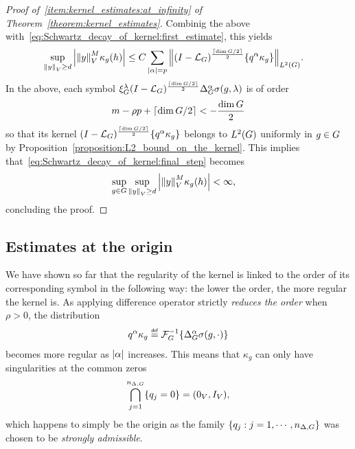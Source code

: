 \begin{proof}[Proof of~\ref{item:kernel_estimates:at_infinity} of Theorem~\ref{theorem:kernel_estimates}]
    Combinig the above with~\eqref{eq:Schwartz_decay_of_kernel:first_estimate},
    this yields
    \begin{align}
        \sup_{\norm y \geq d} &\abs{\norm y^M \kappa_g(h)}
        \leq C \sum_{\abs \alpha = p} \norm [\Lebesgue 2 \Group] {\BesselPotential {\Ceiling {\dim \Group / 2}} \{q^\alpha \kappa_g\}}.
        \label{eq:Schwartz_decay_of_kernel:final_step}
    \end{align}
    In the above,
    each symbol $\xi^{\lambda}_{G} (I - {\mathcal{L}_{G}})^\frac{\lceil\dim G / 2\rceil}{2} {\Delta_{G}^{\alpha}} \sigma(g, \lambda)$ is of order
    \begin{align*}
        m - \rho p + \lceil\dim G / 2\rceil < -\frac {\dim G} 2
    \end{align*}
    so that its kernel $(I - {\mathcal{L}_{G}})^\frac{\lceil\dim G / 2\rceil}{2} \{q^\alpha \kappa_g\}$ belongs to ${L^{2} (G)}$ uniformly in $g \in G$ by Proposition~\ref{proposition:L2_bound_on_the_kernel}.
    This implies that~\eqref{eq:Schwartz_decay_of_kernel:final_step} becomes
    \begin{align*}
        \sup_{g \in G} \sup_{{\left\| y \right\|}_{V} \geq d} &\left|{{\left\| y \right\|}_{V}^M \kappa_g(h)}\right| < \infty,
    \end{align*}
    concluding the proof.
\end{proof}

\subsection{Estimates at the origin}

We have shown so far that the regularity of the kernel is linked to the order of its corresponding symbol in the following way:
the lower the order, the more regular the kernel is.
As applying difference operator strictly \emph{reduces the order} when $\rho > 0$,
the distribution
\begin{align*}
    q^\alpha \kappa_g \defeq \InverseFourier \{ \DifferenceOperatorOrder \alpha \sigma(g, \dummy) \}
\end{align*}
becomes more regular as $\left|{\alpha}\right|$ increases.
This means that $\kappa_g$ can only have singularities at the common zeros
\begin{align*}
    \bigcap_{j = 1}^{n_{\Delta, G}} \{ q_j = 0 \} = (0_V, {I_{V}}),
\end{align*}
which happens to simply be the origin
as the family $\{q_j : j = 1, \cdots, n_{\Delta, G}\}$ was chosen to be \emph{strongly admissible}.

